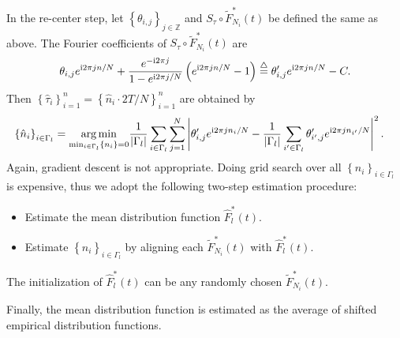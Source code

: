 		In the re-center step, let $\left\{ \theta_{i,j} \right\}_{j\in \mathbb{Z}}$ and $S_\tau\circ\tilde{F}^*_{N_i}(t)$ be defined the same as above.
		The Fourier coefficients of $S_\tau\circ\tilde{F}^*_{N_i}(t)$ are
		\begin{align*}
		\theta_{i,j}e^{\complexunit 2\pi j n/N}+
		\frac{e^{-\complexunit{}2\pi j}}{1-e^{\complexunit{}2\pi j /N}}
		\left( e^{\complexunit{}2\pi j n/N}-1 \right) 
		\overset{\triangle}{=}
		\theta_{i,j}' e^{\complexunit{}2\pi j n/N}-C. 
		\end{align*}
		Then
		$\left\{ \hat \tau_i \right\}_{i=1}^n = \left\{ \hat n_i\cdot 2T/N \right\}_{i=1}^n$ are obtained by 
		\begin{align*}
		\left\{ \hat n_i \right\}_{i\in\Gamma_l} &= 
		\underset{\min_{i\in\Gamma_l} \left\{ n_i \right\}=0}{\arg\min}
		\frac{1}{|\Gamma_l|}
		\sum_{i\in\Gamma_l}
		\sum_{j=1}^N 
		\left| 
		\theta_{i,j}' e^{\complexunit{}2\pi j n_i/N} -
		\frac{1}{|\Gamma_l|}\sum_{i'\in\Gamma_l}\theta_{i',j}' e^{\complexunit{}2\pi j n_{i'}/N}  
		\right|^2 
		.
		\end{align*}
		Again, gradient descent is not appropriate.
		Doing grid search over all $\left\{ n_i \right\}_{i\in\Gamma_l}$ is expensive, thus we adopt the following two-step estimation procedure:
		\begin{itemize}
			\item Estimate the mean distribution function $\hat F^*_l(t)$.
			\item Estimate $\left\{ \hat n_i \right\}_{i\in\Gamma_l}$ by aligning each $\tilde F^*_{N_i}(t) $ with $\hat F^*_l(t)$.
		\end{itemize}
		The initialization of $\hat F^*_l(t)$ can be any randomly chosen $\tilde F^*_{N_i}(t) $.


		Finally, the mean distribution function is estimated as the average of shifted empirical distribution functions.		  



